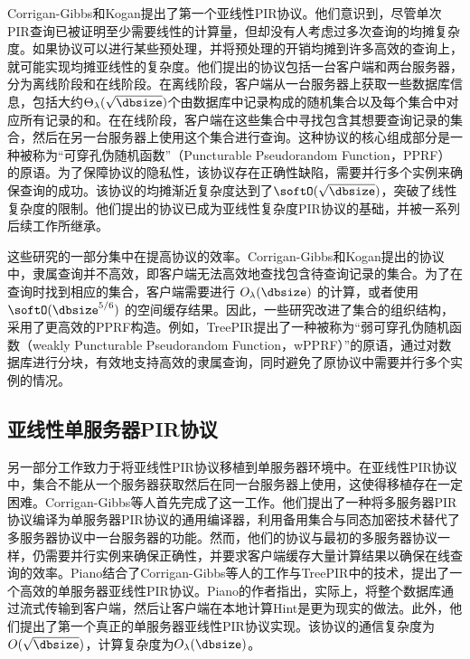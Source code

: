 Corrigan-Gibbs和Kogan提出了第一个亚线性PIR协议\cite{EC:CorKog20}。他们意识到，尽管单次PIR查询已被证明至少需要线性的计算量，但却没有人考虑过多次查询的均摊复杂度。如果协议可以进行某些预处理，并将预处理的开销均摊到许多高效的查询上，就可能实现均摊亚线性的复杂度。他们提出的协议包括一台客户端和两台服务器，分为离线阶段和在线阶段。在离线阶段，客户端从一台服务器上获取一些数据库信息，包括大约$\Theta_\lambda(\sqrt{\dbsize})$个由数据库中记录构成的随机集合以及每个集合中对应所有记录的和。在在线阶段，客户端在这些集合中寻找包含其想要查询记录的集合，然后在另一台服务器上使用这个集合进行查询。这种协议的核心组成部分是一种被称为“可穿孔伪随机函数”（Puncturable Pseudorandom Function，PPRF）的原语。为了保障协议的隐私性，该协议存在正确性缺陷，需要并行多个实例来确保查询的成功。该协议的均摊渐近复杂度达到了$\softO(\sqrt{\dbsize})$，突破了线性复杂度的限制。他们提出的协议已成为亚线性复杂度PIR协议的基础，并被一系列后续工作\cite{Piano,MIR23,EC:CorHenKog22,USENIX:KogCor21,C:LazPap23}所继承。

这些研究的一部分集中在提高协议的效率。Corrigan-Gibbs和Kogan提出的协议中，隶属查询并不高效，即客户端无法高效地查找包含待查询记录的集合。为了在查询时找到相应的集合，客户端需要进行 $O_\lambda(\dbsize)$ 的计算，或者使用 $\softO(\dbsize^{5/6})$ 的空间缓存结果。因此，一些研究\cite{C:LazPap23,C:SACM21}改进了集合的组织结构，采用了更高效的PPRF构造。例如，TreePIR\cite{C:LazPap23}提出了一种被称为“弱可穿孔伪随机函数（weakly Puncturable Pseudorandom Function，wPPRF）”的原语，通过对数据库进行分块，有效地支持高效的隶属查询，同时避免了原协议中需要并行多个实例的情况。

\subsection{亚线性单服务器PIR协议}
另一部分工作\cite{Piano,EC:CorHenKog22}致力于将亚线性PIR协议移植到单服务器环境中。在亚线性PIR协议中，集合不能从一个服务器获取然后在同一台服务器上使用，这使得移植存在一定困难。Corrigan-Gibbs等人首先完成了这一工作\cite{EC:CorHenKog22}。他们提出了一种将多服务器PIR协议编译为单服务器PIR协议的通用编译器，利用备用集合与同态加密技术替代了多服务器协议中一台服务器的功能。然而，他们的协议与最初的多服务器协议一样，仍需要并行实例来确保正确性，并要求客户端缓存大量计算结果以确保在线查询的效率。Piano\cite{Piano}结合了Corrigan-Gibbs等人的工作\cite{EC:CorHenKog22}与TreePIR\cite{C:LazPap23}中的技术，提出了一个高效的单服务器亚线性PIR协议。Piano的作者指出，实际上，将整个数据库通过流式传输到客户端，然后让客户端在本地计算Hint是更为现实的做法。此外，他们提出了第一个真正的单服务器亚线性PIR协议实现。该协议的通信复杂度为 $O(\sqrt{\dbsize})$，计算复杂度为$O_\lambda(\dbsize)$。

